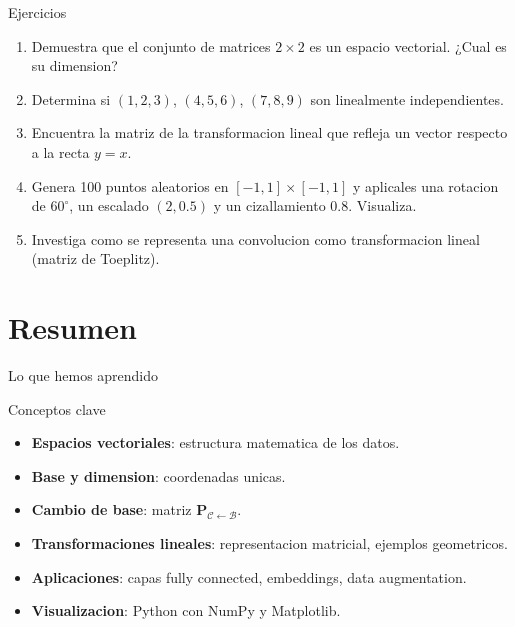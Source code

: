 \documentclass[aspectratio=169, 10pt, xcolor=table]{beamer}
\begin{document}
\begin{frame}{Ejercicios}
    \begin{enumerate}
        \item Demuestra que el conjunto de matrices $2\times2$ es un espacio vectorial. ¿Cual es su dimension?
        \item Determina si $(1,2,3)$, $(4,5,6)$, $(7,8,9)$ son linealmente independientes.
        \item Encuentra la matriz de la transformacion lineal que refleja un vector respecto a la recta $y=x$.
        \item Genera 100 puntos aleatorios en $[-1,1]\times[-1,1]$ y aplicales una rotacion de $60^\circ$, un escalado $(2,0.5)$ y un cizallamiento $0.8$. Visualiza.
        \item Investiga como se representa una convolucion como transformacion lineal (matriz de Toeplitz).
    \end{enumerate}
\end{frame}

\section{Resumen}

\begin{frame}{Lo que hemos aprendido}
    \begin{exampleblock}{Conceptos clave}
        \begin{itemize}
            \item \textbf{Espacios vectoriales}: estructura matematica de los datos.
            \item \textbf{Base y dimension}: coordenadas unicas.
            \item \textbf{Cambio de base}: matriz $\mathbf{P}_{\mathcal{C}\leftarrow\mathcal{B}}$.
            \item \textbf{Transformaciones lineales}: representacion matricial, ejemplos geometricos.
            \item \textbf{Aplicaciones}: capas fully connected, embeddings, data augmentation.
            \item \textbf{Visualizacion}: Python con NumPy y Matplotlib.
        \end{itemize}
    \end{exampleblock}
\end{frame}
\end{document}
